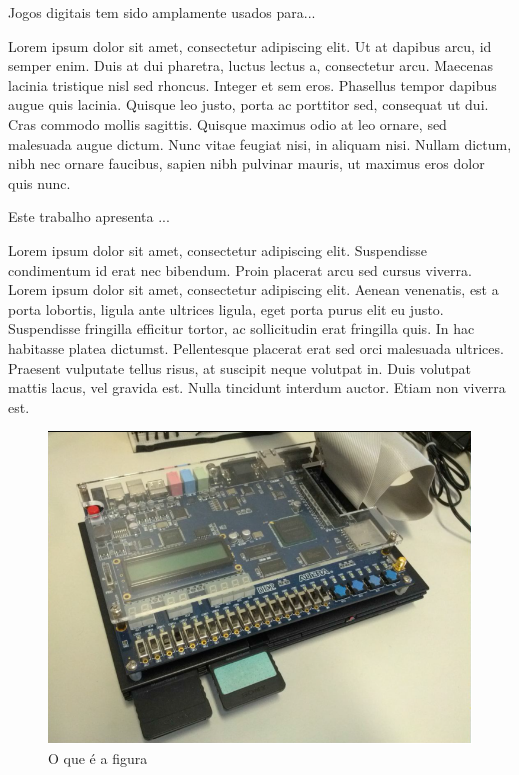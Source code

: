 \documentclass[a4paper]{sbgames}
\begin{document}
Jogos digitais tem sido amplamente usados para...

Lorem ipsum dolor sit amet, consectetur adipiscing elit. Ut at dapibus arcu, id semper enim. Duis at dui pharetra, luctus lectus a, consectetur arcu. Maecenas lacinia tristique nisl sed rhoncus. Integer et sem eros. Phasellus tempor dapibus augue quis lacinia. Quisque leo justo, porta ac porttitor sed, consequat ut dui. Cras commodo mollis sagittis. Quisque maximus odio at leo ornare, sed malesuada augue dictum. Nunc vitae feugiat nisi, in aliquam nisi. Nullam dictum, nibh nec ornare faucibus, sapien nibh pulvinar mauris, ut maximus eros dolor quis nunc.

Este trabalho apresenta ...

Lorem ipsum dolor sit amet, consectetur adipiscing elit. Suspendisse condimentum id erat nec bibendum. Proin placerat arcu sed cursus viverra. Lorem ipsum dolor sit amet, consectetur adipiscing elit. Aenean venenatis, est a porta lobortis, ligula ante ultrices ligula, eget porta purus elit eu justo. Suspendisse fringilla efficitur tortor, ac sollicitudin erat fringilla quis. In hac habitasse platea dictumst. Pellentesque placerat erat sed orci malesuada ultrices. Praesent vulputate tellus risus, at suscipit neque volutpat in. Duis volutpat mattis lacus, vel gravida est. Nulla tincidunt interdum auctor. Etiam non viverra est.


\begin{figure}[htb]
  \begin{center}
   \includegraphics[width=1.0\linewidth]{./Figures/Fig1b.png}
  \end{center}
  \caption{O que é a figura}
  \label{fig:01}
\end{figure}
\end{document}
